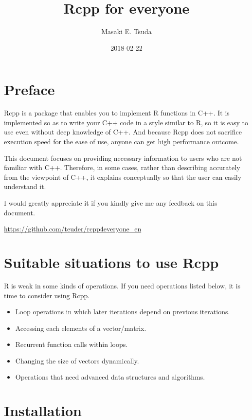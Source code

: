 \documentclass[]{book}
\title{Rcpp for everyone}
\author{Masaki E. Tsuda}
\date{2018-02-22}
\providecommand{\tightlist}{%
  \setlength{\itemsep}{0pt}\setlength{\parskip}{0pt}}
\theoremstyle{definition}
\theoremstyle{definition}
\theoremstyle{remark}
\begin{document}
\maketitle

{
\setcounter{tocdepth}{1}
\tableofcontents
}
\chapter*{Preface}\label{preface}

Rcpp is a package that enables you to implement R functions in C++. It
is implemented so as to write your C++ code in a style similar to R, so
it is easy to use even without deep knowledge of C++. And because Rcpp
does not sacrifice execution speed for the ease of use, anyone can get
high performance outcome.

This document focuses on providing necessary information to users who
are not familiar with C++. Therefore, in some cases, rather than
describing accurately from the viewpoint of C++, it explains
conceptually so that the user can easily understand it.

I would greatly appreciate it if you kindly give me any feedback on this
document.

\url{https://github.com/teuder/rcpp4everyone_en}

\chapter{Suitable situations to use
Rcpp}\label{suitable-situations-to-use-rcpp}

R is weak in some kinds of operations. If you need operations listed
below, it is time to consider using Rcpp.

\begin{itemize}
\tightlist
\item
  Loop operations in which later iterations depend on previous
  iterations.
\item
  Accessing each elements of a vector/matrix.
\item
  Recurrent function calls within loops.
\item
  Changing the size of vectors dynamically.
\item
  Operations that need advanced data structures and algorithms.
\end{itemize}

\chapter{Installation}\label{installation}
\end{document}
